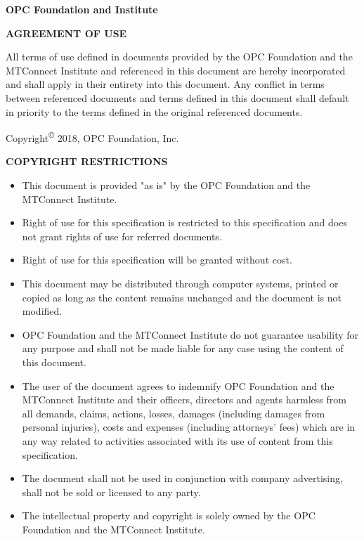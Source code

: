 \textbf{\Large {OPC Foundation and \mtconnect Institute}}

\begin{center}
    \textbf{AGREEMENT OF USE}
\end{center}

All terms of use defined in documents provided by the OPC Foundation and the MTConnect Institute and referenced in this document are hereby incorporated and shall apply in their entirety into this document.   Any conflict in terms between referenced documents and terms defined in this document shall default in priority to the terms defined in the original referenced documents.

Copyright\textsuperscript{\copyright} 2018, OPC Foundation, Inc.

\textbf{COPYRIGHT RESTRICTIONS}

\begin{itemize}
    \item This document is provided "as is" by the OPC Foundation and the MTConnect Institute.
    \item Right of use for this specification is restricted to this specification and does not grant rights of use for referred documents.
    \item Right of use for this specification will be granted without cost.
    \item This document may be distributed through computer systems, printed or copied as long as the content remains unchanged and the document is not modified.
    \item OPC Foundation and the MTConnect Institute do not guarantee usability for any purpose and shall not be made liable for any case using the content of this document.
    \item The user of the document agrees to indemnify OPC Foundation and the MTConnect Institute and their officers, directors and agents harmless from all demands, claims, actions, losses, damages (including damages from personal injuries), costs and expenses (including attorneys' fees) which are in any way related to activities associated with its use of content from this specification.
    \item The document shall not be used in conjunction with company advertising, shall not be sold or licensed to any party.
    
    \item The intellectual property and copyright is solely owned by the OPC Foundation and the MTConnect Institute.
\end{itemize}


